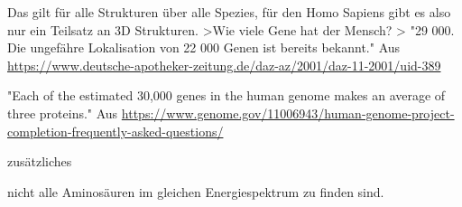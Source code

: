Das gilt für alle Strukturen über alle Spezies, für den Homo Sapiens gibt es also nur ein Teilsatz an 3D Strukturen.
    >Wie viele Gene hat der Mensch? >
    "29 000. Die ungefähre Lokalisation von 22 000 Genen ist bereits bekannt."
Aus \url{https://www.deutsche-apotheker-zeitung.de/daz-az/2001/daz-11-2001/uid-389}

"Each of the estimated 30,000 genes in the human genome makes an average of three proteins."
Aus \url{https://www.genome.gov/11006943/human-genome-project-completion-frequently-asked-questions/}












zusätzliches

nicht alle Aminosäuren im gleichen Energiespektrum zu finden sind.